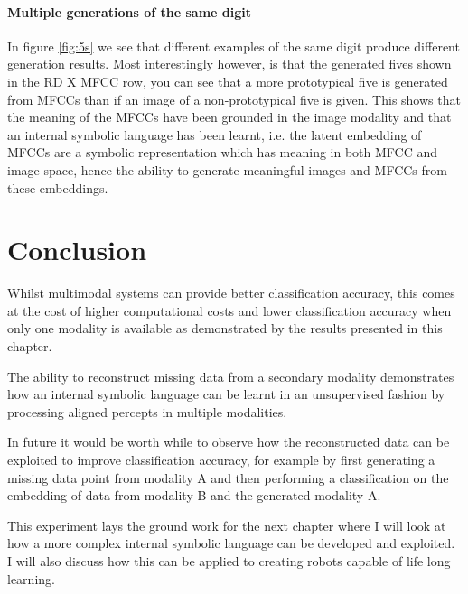 \paragraph{Multiple generations of the same digit}
In figure \ref{fig:5s} we see that different examples of the same digit produce different generation results. Most interestingly however, is that the generated fives shown in the RD X MFCC row, you can see that a more prototypical five is generated from MFCCs than if an image of a non-prototypical five is given. This shows that the meaning of the MFCCs have been grounded in the image modality and that an internal symbolic language has been learnt, i.e. the latent embedding of MFCCs are a symbolic representation which has meaning in both MFCC and image space, hence the ability to generate meaningful images and MFCCs from these embeddings.

\section{Conclusion}
Whilst multimodal systems can provide better classification accuracy, this comes at the cost of higher computational costs and lower classification accuracy when only one modality is available as demonstrated by the results presented in this chapter.

The ability to reconstruct missing data from a secondary modality demonstrates how an internal symbolic language can be learnt in an unsupervised fashion by processing aligned percepts in multiple modalities.

In future it would be worth while to observe how the reconstructed data can be exploited to improve classification accuracy, for example by first generating a missing data point from modality A and then performing a classification on the embedding of data from modality B and the generated modality A.

This experiment lays the ground work for the next chapter where I will look at how a more complex internal symbolic language can be developed and exploited. I will also discuss how this can be applied to creating robots capable of life long learning. 
